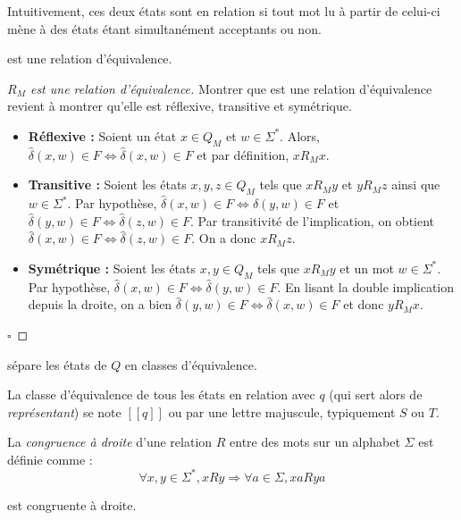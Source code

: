 	 Intuitivement, ces deux états sont en relation si tout mot lu à partir de celui-ci mène à des états étant simultanément acceptants ou non. 
	 
	 \begin{proposition}[$R_M$]
	 	\rm est une relation d'équivalence.
	 \end{proposition}
	
	 \begin{proof}[$R_M$ est une relation d'équivalence] Montrer que \rm est une relation d'équivalence revient à montrer qu'elle est réflexive, transitive et symétrique.
	 	\begin{itemize}
	 		\item \textbf{Réflexive :} Soient un état $x \in Q_M$ et $w \in \Sigma^*$. Alors, $\hat{\delta}(x,w) \in F \iff \hat{\delta}(x,w) \in F$ et par définition, $xR_Mx$.
	 		\item \textbf{Transitive :} Soient les états $x,y,z \in Q_M$ tels que $xR_My$ et $yR_Mz$ ainsi que $w \in \Sigma^*$. Par hypothèse, $\hat{\delta}(x,w) \in F \iff \hat{\delta}(y,w)\in F$ et $\hat{\delta}(y,w) \in F\iff \hat{\delta}(z,w) \in F$. Par transitivité de l'implication, on obtient $\hat{\delta}(x,w) \in F \iff \hat{\delta}(z,w)\in F$. On a donc $xR_Mz$.
	 		\item \textbf{Symétrique : } Soient les états $x,y \in Q_M$ tels que $xR_My$ et un mot $w \in \Sigma^*$. Par hypothèse, $\hat{\delta}(x, w)\in F \iff \hat{\delta}(y, w)\in F$. En lisant la double implication depuis la droite, on a bien $\hat{\delta}(y, w) \in F\iff \hat{\delta}(x, w)\in F$ et donc $yR_Mx$.
	 	\end{itemize}
 		\hfill$\square$
	 \end{proof}
	 
	 \begin{corollary}
	 	\rm sépare les états de $Q$ en classes d'équivalence.
	 \end{corollary}
	 
	 La classe d'équivalence de tous les états en relation \rm avec $q$ (qui sert alors de \emph{représentant}) se note $[[q]]$ ou par une lettre majuscule, typiquement $S$ ou $T$.
	 
	 La \emph{congruence à droite} d'une relation $R$ entre des mots sur un alphabet $\Sigma$ est définie comme :
	 $$
	 \forall x,y \in \Sigma^*, xRy \Rightarrow \forall a \in \Sigma, xaRya 
	 $$  
	 
	 \begin{proposition}[Congruence de \rm]
	 	\rm est congruente à droite.
	 \end{proposition}
	 
